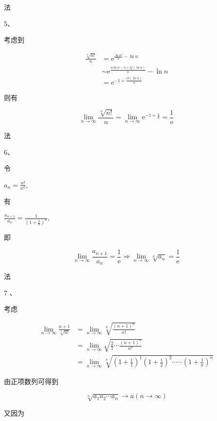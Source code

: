 \documentclass[10pt]{article}
\begin{document}
\begin{CJK}{UTF8}{mj}法\end{CJK} 5、\begin{CJK}{UTF8}{mj}考虑到\end{CJK}
$$
\begin{aligned}
\frac{\sqrt[n]{n !}}{n} &=\mathrm{e}^{\frac{\ln n !}{n}-\ln n} \\
& \sim \mathrm{e}^{\frac{n \ln n-n+Q(\ln n)}{n}}-\ln n \\
&=\mathrm{e}^{-1+\frac{O(\ln n)}{n}}
\end{aligned}
$$
\begin{CJK}{UTF8}{mj}则有\end{CJK}
$$
\lim _{n \rightarrow \infty} \frac{\sqrt[n]{n !}}{n}=\lim _{n \rightarrow \infty} \mathrm{e}^{-1+\frac{1}{n}}=\frac{1}{\mathrm{e}}
$$
\begin{CJK}{UTF8}{mj}法\end{CJK} 6、\begin{CJK}{UTF8}{mj}令\end{CJK} $a_{n}=\frac{n !}{n^{n}}$, \begin{CJK}{UTF8}{mj}有\end{CJK} $\frac{a_{n+1}}{a_{n}}=\frac{1}{\left(1+\frac{1}{n}\right)^{n}}$, \begin{CJK}{UTF8}{mj}即\end{CJK}
$$
\lim _{n \rightarrow \infty} \frac{a_{n+1}}{a_{n}}=\frac{1}{\mathrm{e}} \Rightarrow \lim _{n \rightarrow \infty} \sqrt[n]{a_{n}}=\frac{1}{\mathrm{e}}
$$
\begin{CJK}{UTF8}{mj}法\end{CJK} 7 、\begin{CJK}{UTF8}{mj}考虑\end{CJK}
$$
\begin{aligned}
\lim _{n \rightarrow \infty} \frac{n+1}{\sqrt[n]{n !}} &=\lim _{n \rightarrow \infty} \sqrt[n]{\frac{(n+1)^{n}}{n !}} \\
&=\lim _{n \rightarrow \infty} \sqrt{\frac{2}{1} \cdots \frac{(n+1)^{n}}{n^{n}}} \\
&=\lim _{n \rightarrow \infty} \sqrt[n]{\left(1+\frac{1}{1}\right)^{1}\left(1+\frac{1}{2}\right)^{2} \cdots \cdots\left(1+\frac{1}{n}\right)^{n}}
\end{aligned}
$$
\begin{CJK}{UTF8}{mj}由正项数列可得到\end{CJK}
$$
\sqrt[n]{a_{1} a_{2} \cdots a_{n}} \longrightarrow a(n \rightarrow \infty)
$$
\begin{CJK}{UTF8}{mj}又因为\end{CJK}
\end{document}
